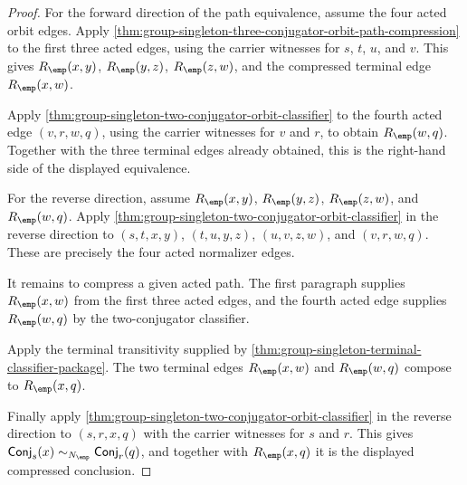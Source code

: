 \begin{proof}
For the forward direction of the path equivalence, assume the four acted orbit
edges. Apply
\autoref{thm:group-singleton-three-conjugator-orbit-path-compression} to the
first three acted edges, using the carrier witnesses for $s$, $t$, $u$, and
$v$. This gives $R_{\emp}(x,y)$, $R_{\emp}(y,z)$, $R_{\emp}(z,w)$, and the
compressed terminal edge $R_{\emp}(x,w)$.

Apply
\autoref{thm:group-singleton-two-conjugator-orbit-classifier} to the fourth
acted edge $(v,r,w,q)$, using the carrier witnesses for $v$ and $r$, to obtain
$R_{\emp}(w,q)$. Together with the three terminal edges already obtained, this
is the right-hand side of the displayed equivalence.

For the reverse direction, assume $R_{\emp}(x,y)$, $R_{\emp}(y,z)$,
$R_{\emp}(z,w)$, and $R_{\emp}(w,q)$. Apply
\autoref{thm:group-singleton-two-conjugator-orbit-classifier} in the reverse
direction to $(s,t,x,y)$, $(t,u,y,z)$, $(u,v,z,w)$, and $(v,r,w,q)$. These are
precisely the four acted normalizer edges.

It remains to compress a given acted path. The first paragraph supplies
$R_{\emp}(x,w)$ from the first three acted edges, and the fourth acted edge
supplies $R_{\emp}(w,q)$ by the two-conjugator classifier.

Apply the terminal transitivity supplied by
\autoref{thm:group-singleton-terminal-classifier-package}. The two terminal
edges $R_{\emp}(x,w)$ and $R_{\emp}(w,q)$ compose to $R_{\emp}(x,q)$.

Finally apply
\autoref{thm:group-singleton-two-conjugator-orbit-classifier} in the reverse
direction to $(s,r,x,q)$ with the carrier witnesses for $s$ and $r$. This gives
$\mathsf{Conj}_s(x)\sim_{N_{\emp}}\mathsf{Conj}_r(q)$, and together with
$R_{\emp}(x,q)$ it is the displayed compressed conclusion.
\end{proof}
